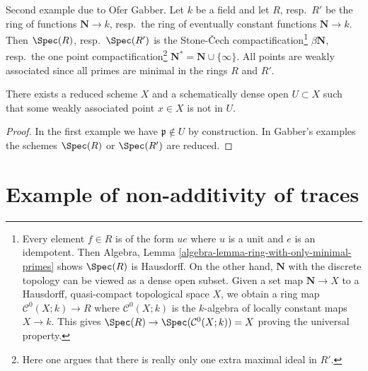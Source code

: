 \medskip\noindent
Second example due to Ofer Gabber. Let $k$ be a field and let
$R$, resp.\ $R'$ be the ring of functions $\mathbf{N} \to k$, resp.\ the ring
of eventually constant functions $\mathbf{N} \to k$. Then $\Spec(R)$,
resp.\ $\Spec(R')$ is the
Stone-{\v C}ech compactification\footnote{Every element $f \in R$ is of
the form $ue$ where $u$ is a unit and $e$ is an idempotent. Then
Algebra, Lemma \ref{algebra-lemma-ring-with-only-minimal-primes}
shows $\Spec(R)$ is Hausdorff. On the other hand, $\mathbf{N}$ with the
discrete topology can be viewed as a dense open subset. Given a set map
$\mathbf{N} \to X$ to a Hausdorff, quasi-compact topological space $X$,
we obtain a ring map $\mathcal{C}^0(X; k) \to R$ where $\mathcal{C}^0(X; k)$
is the $k$-algebra of locally constant maps $X \to k$. This gives
$\Spec(R) \to \Spec(\mathcal{C}^0(X; k)) = X$ proving the universal
property.} $\beta\mathbf{N}$, resp.\ the
one point compactification\footnote{Here one argues that there is really
only one extra maximal ideal in $R'$.}
$\mathbf{N}^* = \mathbf{N} \cup \{\infty\}$.
All points are weakly associated since all primes are minimal in the
rings $R$ and $R'$.

\begin{lemma}
\label{lemma-example-schematically-dense-missing-weakly-associated-point}
There exists a reduced scheme $X$ and a schematically dense open
$U \subset X$ such that some weakly associated point $x \in X$ is not in $U$.
\end{lemma}

\begin{proof}
In the first example we have $\mathfrak p \not \in U$ by construction.
In Gabber's examples the schemes $\Spec(R)$ or $\Spec(R')$ are reduced.
\end{proof}



\section{Example of non-additivity of traces}
\label{section-non-additive}

